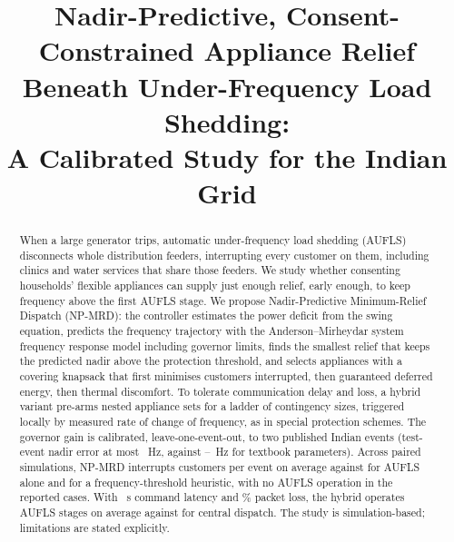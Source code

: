 \documentclass[conference]{IEEEtran}
\begin{document}
\title{Nadir-Predictive, Consent-Constrained Appliance Relief\\Beneath Under-Frequency Load Shedding:\\A Calibrated Study for the Indian Grid}

\author{
}

\maketitle

\begin{abstract}
When a large generator trips, automatic under-frequency load shedding (AUFLS) disconnects whole distribution feeders, interrupting every customer on them, including clinics and water services that share those feeders. We study whether consenting households' flexible appliances can supply just enough relief, early enough, to keep frequency above the first AUFLS stage. We propose Nadir-Predictive Minimum-Relief Dispatch (NP-MRD): the controller estimates the power deficit from the swing equation, predicts the frequency trajectory with the Anderson--Mirheydar system frequency response model including governor limits, finds the smallest relief that keeps the predicted nadir above the protection threshold, and selects appliances with a covering knapsack that first minimises customers interrupted, then guaranteed deferred energy, then thermal discomfort. To tolerate communication delay and loss, a hybrid variant pre-arms nested appliance sets for a ladder of contingency sizes, triggered locally by measured rate of change of frequency, as in special protection schemes. The governor gain is calibrated, leave-one-event-out, to two published Indian events (test-event nadir error at most \CalTestErrMax~Hz, against \CalDefaultErrMin--\CalDefaultErrMax~Hz for textbook parameters). Across \RunsMain{} paired simulations, NP-MRD interrupts \CustNpmrd{} customers per event on average against \CustAufls{} for AUFLS alone and \CustHeur{} for a frequency-threshold heuristic, with no AUFLS operation in the reported cases. With \WorstLatency~s command latency and \WorstLoss\% packet loss, the hybrid operates \WorstStagesHy{} AUFLS stages on average against \WorstStagesNp{} for central dispatch. The study is simulation-based; limitations are stated explicitly.
\end{abstract}
\end{document}
